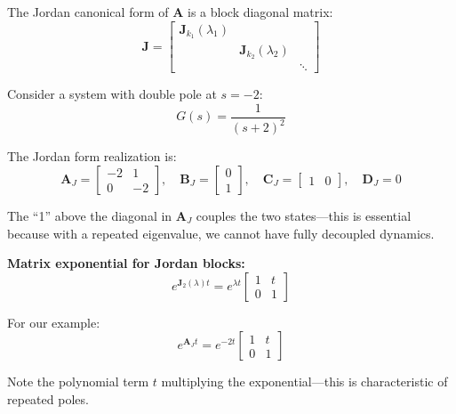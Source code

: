The Jordan canonical form of $\mathbf{A}$ is a block diagonal matrix:
\begin{equation}
\mathbf{J} = \begin{bmatrix}
\mathbf{J}_{k_1}(\lambda_1) & & \\
& \mathbf{J}_{k_2}(\lambda_2) & \\
& & \ddots
\end{bmatrix}
\end{equation}

\begin{example}
\label{ex:jordan_form}
Consider a system with double pole at $s = -2$:
\begin{equation}
G(s) = \frac{1}{(s+2)^2}
\end{equation}

The Jordan form realization is:
\begin{equation}
\mathbf{A}_J = \begin{bmatrix} -2 & 1 \\ 0 & -2 \end{bmatrix}, \quad
\mathbf{B}_J = \begin{bmatrix} 0 \\ 1 \end{bmatrix}, \quad
\mathbf{C}_J = \begin{bmatrix} 1 & 0 \end{bmatrix}, \quad
\mathbf{D}_J = 0
\end{equation}

The ``1'' above the diagonal in $\mathbf{A}_J$ couples the two states---this is essential because with a repeated eigenvalue, we cannot have fully decoupled dynamics.

\textbf{Matrix exponential for Jordan blocks:}
\begin{equation}
e^{\mathbf{J}_2(\lambda)t} = e^{\lambda t}\begin{bmatrix} 1 & t \\ 0 & 1 \end{bmatrix}
\end{equation}

For our example:
\begin{equation}
e^{\mathbf{A}_J t} = e^{-2t}\begin{bmatrix} 1 & t \\ 0 & 1 \end{bmatrix}
\end{equation}

Note the polynomial term $t$ multiplying the exponential---this is characteristic of repeated poles.
\end{example}

